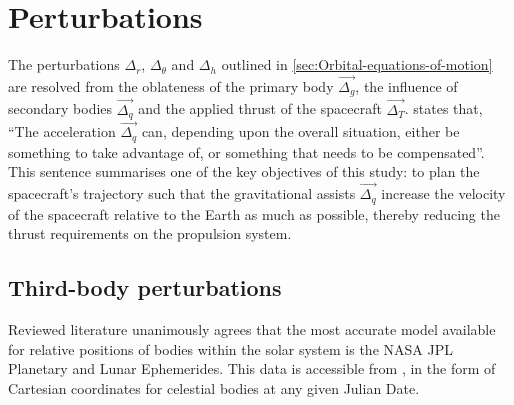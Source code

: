 \section{Perturbations} \label{sec:Perturbations}

The perturbations $\Delta_r$, $\Delta_\theta$ and $\Delta_h$ outlined in \autoref{sec:Orbital-equations-of-motion} are resolved from the oblateness of the primary body $\vec{\Delta_g}$, the influence of secondary bodies $\vec{\Delta_q}$ and the applied thrust of the spacecraft $\vec{\Delta_T}$. \textcite{Erb_thesis} states that, \enquote{The acceleration $\vec{\Delta_q}$ can, depending upon the overall situation, either be something to take advantage of, or something that needs to be compensated}. This sentence summarises one of the key objectives of this study: to plan the spacecraft's trajectory such that the gravitational assists $\vec{\Delta_q}$ increase the velocity of the spacecraft relative to the Earth as much as possible, thereby reducing the thrust requirements on the propulsion system.




\subsection{Third-body perturbations} \label{sub:Ephemerides}

Reviewed literature unanimously agrees that the most accurate model available for relative positions of bodies within the solar system is the NASA JPL Planetary and Lunar Ephemerides. This data is accessible from \textcite{web_JetPropulsionLaboratory2004}, in the form of Cartesian coordinates for celestial bodies at any given Julian Date.

